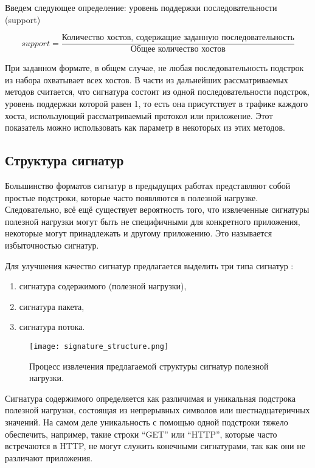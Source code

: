 Введем следующее определение: уровень поддержки последовательности (support)

\[ support = \dfrac{\text{Количество хостов, содержащие заданную последовательность}}{\text{Общее количество хостов}} \]

При заданном формате, в общем случае, не любая последовательность подстрок из набора охватывает всех хостов.
В части из дальнейших рассматриваемых методов считается, что сигнатура состоит из одной последовательности подстрок, уровень поддержки которой равен 1,
то есть она присутствует в трафике каждого хоста, использующий рассматриваемый протокол или приложение.
Этот показатель можно использовать как параметр в некоторых из этих методов.

\subsection{Структура сигнатур}

Большинство форматов сигнатур в предыдущих работах \cite{park2008towards,ye2009autosig,santosautomatic} представляют собой простые подстроки, которые часто появляются в полезной нагрузке.
Следовательно, всё ещё существует вероятность того, что извлеченные сигнатуры полезной нагрузки могут быть не специфичными для конкретного приложения,
некоторые могут принадлежать и другому приложению. Это называется избыточностью сигнатур.

Для улучшения качество сигнатур предлагается выделить три типа сигнатур \cite{goo2016payload, shim2019automatic}:

\begin{enumerate}
    \item сигнатура содержимого (полезной нагрузки),
    \item сигнатура пакета,
    \item сигнатура потока.
\end{enumerate}

\begin{figure}[h!]
    \begin{center}
        \texttt{[image: signature\_structure.png]}
        \caption{Процесс извлечения предлагаемой структуры сигнатур полезной нагрузки.}
    \end{center}
\end{figure}

Сигнатура содержимого определяется как различимая и уникальная подстрока полезной нагрузки, состоящая из непрерывных символов или шестнадцатеричных значений.
На самом деле уникальность с помощью одной подстроки тяжело обеспечить, например, такие строки ``GET''  или ``HTTP'', которые часто встречаются в HTTP,
не могут служить конечными сигнатурами, так как они не различают приложения.

